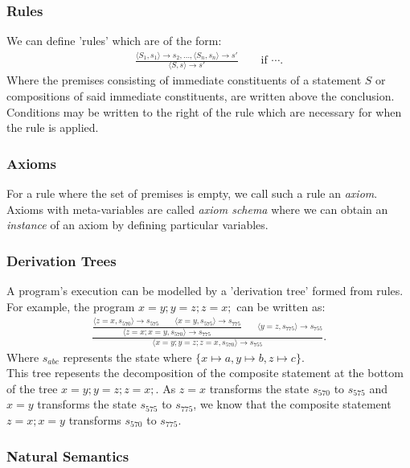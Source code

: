 \documentclass[a4paper, 12pt, twoside]{article}
\begin{document}
\subsubsection{Rules}

We can define 'rules' which are of the form: \begin{gather*}
  \frac{
    \langle S_1, s_1 \rangle \to s_2, \ldots, \langle S_n, s_n \rangle \to s'
  }{
    \langle S, s \rangle \to s'
  } \qquad \text{if } \cdots.
\end{gather*} Where the premises consisting of immediate constituents 
of a statement $S$ or compositions of said immediate constituents, 
are written above the conclusion. Conditions may be written to the right
of the rule which are necessary for when the rule is applied.

\subsubsection{Axioms}

For a rule where the set of premises is empty, we call 
such a rule an \textit{axiom}. Axioms with meta-variables
are called \textit{axiom schema} where we can obtain an
\textit{instance} of an axiom by defining particular
variables.

\subsubsection{Derivation Trees}

A program's execution can be modelled by a 'derivation tree'
formed from rules.
For example, the program $x=y;y=z;z=x;$ can be written as:
\begin{gather*}
  \frac{\dfrac{
    \langle z=x, s_{570} \rangle \to s_{575} 
    \qquad \langle x=y, s_{575} \rangle \to s_{775}
  }{\langle z=x;x=y, s_{570} \rangle \to s_{775}}
  \qquad \langle y=z, s_{775} \rangle \to s_{755}}
  {\langle x=y;y=z;z=x, s_{570} \rangle \to s_{755}}.
\end{gather*} Where $s_{abc}$ represents the state where 
$\{x \mapsto a, y \mapsto b, z \mapsto c\}$.
\\[\baselineskip]
This tree repesents the decomposition of the composite statement
at the bottom of the tree $x=y;y=z;z=x;$. As $z=x$ transforms
the state $s_{570}$ to $s_{575}$ and $x=y$ transforms the state
$s_{575}$ to $s_{775}$, we know that the composite statement
$z=x;x=y$ transforms $s_{570}$ to $s_{775}$.

\subsubsection{Natural Semantics}
\end{document}
